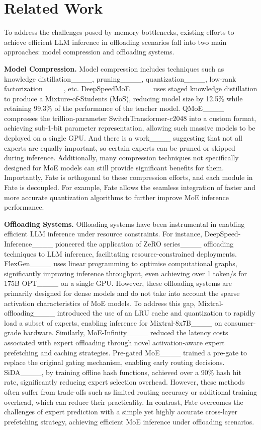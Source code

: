 \section{Related Work}
To address the challenges posed by memory bottlenecks, existing efforts to achieve efficient LLM inference in offloading scenarios fall into two main approaches: model compression and offloading systems.

\textbf{Model Compression.} Model compression includes techniques such as knowledge distillation____, pruning____, quantization____, low-rank factorization____, etc. DeepSpeedMoE____ uses staged knowledge distillation to produce a Mixture-of-Students (MoS), reducing model size by 12.5\% while retaining 99.3\% of the performance of the teacher model. QMoE____ compresses the trillion-parameter SwitchTransformer-c2048 into a custom format, achieving sub-1-bit parameter representation, allowing such massive models to be deployed on a single GPU. And there is a work____ suggesting that not all experts are equally important, so certain experts can be pruned or skipped during inference. 
Additionally, many compression techniques not specifically designed for MoE models can still provide significant benefits for them. Importantly, Fate is orthogonal to these compression efforts, and each module in Fate is decoupled. For example, Fate allows the seamless integration of faster and more accurate quantization algorithms to further improve MoE inference performance.

\textbf{Offloading Systems.} Offloading systems have been instrumental in enabling efficient LLM inference under resource constraints. For instance, DeepSpeed-Inference____ pioneered the application of ZeRO series____ offloading techniques to LLM inference, facilitating resource-constrained deployments. FlexGen____ uses linear programming to optimise computational graphs, significantly improving inference throughput, even achieving over 1 token/s for 175B OPT____ on a single GPU. However, these offloading systems are primarily designed for dense models and do not take into account the sparse activation characteristics of MoE models.
To address this gap, Mixtral-offloading____ introduced the use of an LRU cache and quantization to rapidly load a subset of experts, enabling inference for Mixtral-8x7B____ on consumer-grade hardware. Similarly, MoE-Infinity____ reduced the latency costs associated with expert offloading through novel activation-aware expert prefetching and caching strategies. Pre-gated MoE____ trained a pre-gate to replace the original gating mechanism, enabling early routing decisions. SiDA____, by training offline hash functions, achieved over a 90\% hash hit rate, significantly reducing expert selection overhead.
However, these methods often suffer from trade-offs such as limited routing accuracy or additional training overhead, which can reduce their practicality. In contrast, Fate overcomes the challenges of expert prediction with a simple yet highly accurate cross-layer prefetching strategy, achieving efficient MoE inference under offloading scenarios.